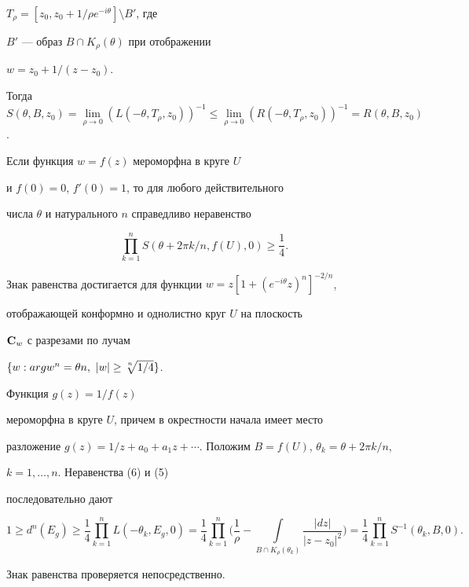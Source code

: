 $T_\rho=[z_0, z_0+1/\rho e^{-i\theta}]\setminus B'$, где


$B'$ --- образ $B\cap K_\rho(\theta)$ при отображении


$w=z_0+1/(z-z_0)$.


Тогда $S(\theta, B, z_0)


=\lim\limits_{\rho\to 0} (L(-\theta, T_\rho, z_0))^{-1}\leq


\lim\limits_{\rho\to 0} (R(-\theta, T_\rho, z_0))^{-1}=


R(\theta, B, z_0)$.





\begin{thm} Если функция $w=f(z)$ мероморфна в круге $U$ 


и $f(0)=0$, $f'(0)=1$, то для любого действительного


числа $\theta $ и натурального $n$ справедливо неравенство


$$


\prod_{k=1}^n S(\theta+2\pi k/n, f(U), 0)


\geq \frac{1}{4}.


$$


Знак равенства достигается для функции $w=z[1+(e^{-i\theta}z)^n]^{-2/n}$,


отображающей конформно и однолистно круг $U$ на плоскость


${\bf C}_w$ с разрезами по лучам


$\{ w:arg w^n=\theta n,\ |w|\geq \sqrt[\uproot{2}n]{1/4}\} $.


\end{thm}





\begin{pf} Функция $g(z)=1/f(z)$ 


мероморфна в круге $U$, причем в окрестности начала имеет место


разложение $g(z)=1/z


+a_0+a_1z+\dotsb$. Положим $B=f(U)$, $\theta_k=\theta + 2\pi k/n$,


$k=1,\dotsc,n$. Неравенства (6) и (5)


последовательно дают


$$


1\geq d^n(E_g)\geq 


\frac{1}{4} \prod_{k=1}^n L(-\theta_ k, E_g,0)=


\frac{1}{4} \prod_{k=1}^n 


\bigg( \frac{1}{\rho}-\int\limits_{B\cap K_\rho(\theta_k)}


\frac{|dz|}{|z-z_0|^2}\bigg)=


\frac{1}{4} \prod_{k=1}^n S^{-1}(\theta_k, B, 0).


$$


Знак равенства проверяется непосредственно.


\end{pf}





